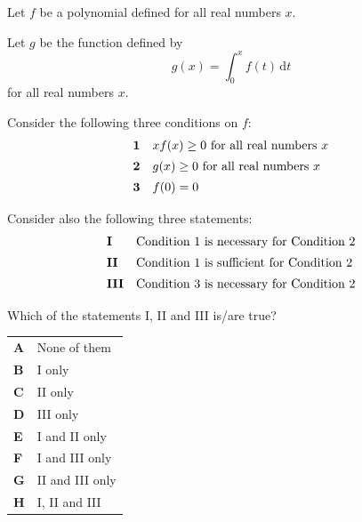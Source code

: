 \documentclass[11pt,a4paper]{article}
\begin{document}
\clearpage
\thispagestyle{djspaper}
\vspace*{8pt}
\begin{enumerate}[label=\textbf{\arabic*.},leftmargin=*,itemsep=0pt,start=10]
\questionitem[Logic]
Let $f$ be a polynomial defined for all real numbers $x$.

Let $g$ be the function defined by
\[
g(x) = \int_0^x f(t)\,\mathrm{d}t
\]
for all real numbers $x$.

Consider the following three conditions on $f$:
\[
\begin{array}{@{}ll@{}}
\textbf{1} & x f(x) \ge 0\text{ for all real numbers }x \\[5pt]
\textbf{2} & g(x) \ge 0\text{ for all real numbers }x \\[5pt]
\textbf{3} & f(0) = 0\\[5pt]
\end{array}
\]
Consider also the following three statements:
\[
\begin{array}{@{}ll@{}}
\textbf{I} & \text{Condition 1 is necessary for Condition 2} \\[5pt]
\textbf{II} & \text{Condition 1 is sufficient for Condition 2} \\[5pt]
\textbf{III} & \text{Condition 3 is necessary for Condition 2} \\[5pt]
\end{array}
\]
Which of the statements I, II and III is/are true?

\par\vspace*{12pt}
\begin{tabularx}{\linewidth}{@{}>{\bfseries}l Y@{}}
A &
None of them
\\[0.8em]
B &
I only
\\[0.8em]
C &
II only
\\[0.8em]
D &
III only
\\[0.8em]
E &
I and II only
\\[0.8em]
F &
I and III only
\\[0.8em]
G &
II and III only
\\[0.8em]
H &
I, II and III
\\
\end{tabularx}
\end{enumerate}
\end{document}
